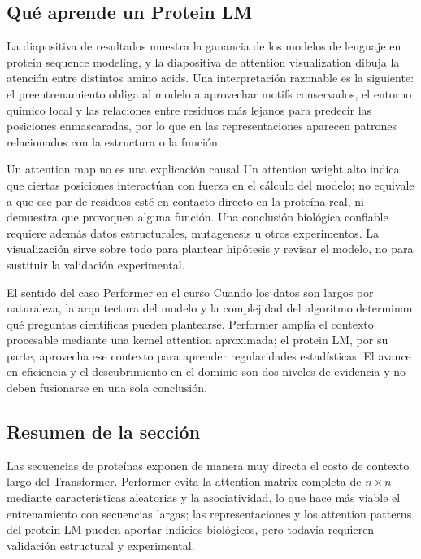 \subsection{Qué aprende un Protein LM}

La diapositiva de resultados muestra la ganancia de los modelos de lenguaje en protein sequence modeling, y la diapositiva de attention visualization dibuja la atención entre distintos amino acids. Una interpretación razonable es la siguiente: el preentrenamiento obliga al modelo a aprovechar motifs conservados, el entorno químico local y las relaciones entre residuos más lejanos para predecir las posiciones enmascaradas, por lo que en las representaciones aparecen patrones relacionados con la estructura o la función.



\begin{warningbox}{Un attention map no es una explicación causal}
Un attention weight alto indica que ciertas posiciones interactúan con fuerza en el cálculo del modelo; no equivale a que ese par de residuos esté en contacto directo en la proteína real, ni demuestra que provoquen alguna función. Una conclusión biológica confiable requiere además datos estructurales, mutagenesis u otros experimentos. La visualización sirve sobre todo para plantear hipótesis y revisar el modelo, no para sustituir la validación experimental.
\end{warningbox}

\begin{importantbox}{El sentido del caso Performer en el curso}
Cuando los datos son largos por naturaleza, la arquitectura del modelo y la complejidad del algoritmo determinan qué preguntas científicas pueden plantearse. Performer amplía el contexto procesable mediante una kernel attention aproximada; el protein LM, por su parte, aprovecha ese contexto para aprender regularidades estadísticas. El avance en eficiencia y el descubrimiento en el dominio son dos niveles de evidencia y no deben fusionarse en una sola conclusión.
\end{importantbox}

\subsection{Resumen de la sección}

Las secuencias de proteínas exponen de manera muy directa el costo de contexto largo del Transformer. Performer evita la attention matrix completa de $n\times n$ mediante características aleatorias y la asociatividad, lo que hace más viable el entrenamiento con secuencias largas; las representaciones y los attention patterns del protein LM pueden aportar indicios biológicos, pero todavía requieren validación estructural y experimental.
